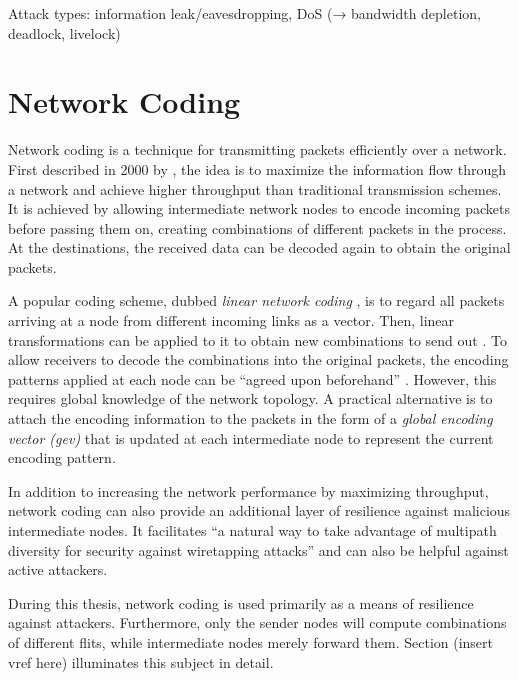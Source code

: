 Attack types: information leak/eavesdropping, DoS (→ bandwidth depletion, deadlock, livelock)

\section{Network Coding}\label{sec:networkcodingfun}
Network coding is a technique for transmitting packets efficiently over a network. First described in 2000 by \citeauthor{ahlswede00networkflow}
\cite{ahlswede00networkflow}, the idea is to maximize the information flow through a network and achieve higher throughput than traditional transmission
schemes. It is achieved by allowing intermediate network nodes to encode incoming packets before passing them on, creating combinations of different
packets in the process. At the destinations, the received data can be decoded again to obtain the original packets.

A popular coding scheme, dubbed \textit{linear network coding} \cite{li03linearnc}, is to regard all packets arriving at a node from different incoming links as a vector.
Then, linear transformations can be applied to it to obtain new combinations to send out \cite[1]{li03linearnc}. To allow receivers to decode the
combinations into the original packets, the encoding patterns applied at each node can be \enquote{agreed upon beforehand} \cite[1]{li03linearnc}.
However, this requires global knowledge of the network topology. A practical alternative is to attach the encoding information to the packets in the
form of a \textit{global encoding vector (\gls{gev})} \cites[2\psqq]{chou03practicalnc}[5\psq]{chou07ncforinternetandwireless} that is updated at each intermediate node to
represent the current encoding pattern.

In addition to increasing the network performance by maximizing throughput, network coding can also provide an additional layer of resilience against
malicious intermediate nodes. It facilitates \enquote{a natural way to take advantage of multipath diversity for security against wiretapping attacks}
\cite[8]{fragouli07ncfundamentals} and can also be helpful against active attackers.

During this thesis, network coding is used primarily as a means of resilience against attackers. Furthermore, only the sender nodes will compute
combinations of different flits, while intermediate nodes merely forward them. Section (insert vref here) illuminates this subject in detail.

